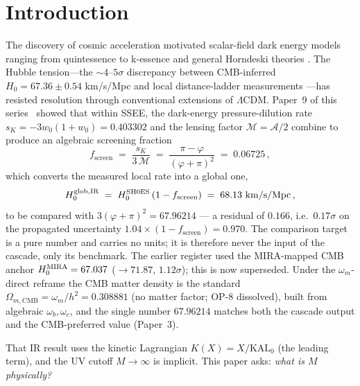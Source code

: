 \documentclass[12pt,a4paper]{article}
\newcommand{\phiG}{\varphi}
\newcommand{\KAL}{\mathrm{KAL}_0}
\newcommand{\MIRA}{\mathcal{M}}
\newcommand{\AURA}{\mathcal{A}}
\newcommand{\fsc}{f_{\mathrm{screen}}}
\newcommand{\sK}{s_K}
\renewcommand{\Omega}{\varOmega}
\begin{document}
\clearpage
{\small\tableofcontents}
\clearpage

\section{Introduction}

The discovery of cosmic acceleration \citep{Riess1998,Perlmutter1999} motivated
scalar-field dark energy models ranging from quintessence \citep{Ratra1988,Caldwell2002}
to k-essence \citep{ArmendarizPicon2001} and general Horndeski theories
\citep{Horndeski1974,Copeland2006,Weinberg2013review}.
The Hubble tension---the $\sim4$--$5\sigma$ discrepancy between CMB-inferred
$H_0 = 67.36 \pm 0.54$ km/s/Mpc \citep{Planck2018} and local distance-ladder
measurements \citep{Verde2019,Kamionkowski2023}---has
resisted resolution through conventional extensions of $\Lambda$CDM.
Paper~9 of this series~\citep{SSEE9} showed that within SSEE, the dark-energy
pressure-dilution rate $\sK = -3w_0(1+w_0) = 0.403302$ \citep{SSEE7,SSEE8} and the lensing factor
$\MIRA = \AURA/2$ combine to produce an algebraic screening fraction
\begin{equation}
  \fsc \;=\; \frac{\sK}{3\,\MIRA}
       \;=\; \frac{\pi - \phiG}{(\phiG+\pi)^2}
       \;=\; 0.06725\,,
\end{equation}
which converts the measured local rate into a global one,
\begin{equation}
  H_0^{\rm glob,IR} \;=\; H_0^{\rm SH0ES}\,(1 - \fsc) \;=\; 68.13 \text{ km/s/Mpc}\,,
\end{equation}
to be compared with $3(\phiG+\pi)^2 = 67.96214$ --- a residual of $0.166$,
i.e.\ $0.17\sigma$ on the propagated uncertainty $1.04\times(1-\fsc)=0.970$.
The comparison target is a pure number and carries no units; it is therefore
never the input of the cascade, only its benchmark. The earlier
register used the MIRA-mapped CMB anchor $H_0^{\rm MIRA} = 67.037$ ($\to 71.87$,
$1.12\sigma$); this is now superseded. Under the $\omega_m$-direct reframe the
CMB matter density is the standard $\Omega_{m,\mathrm{CMB}}=\omega_m/h^2=0.308881$
(no matter factor; OP-8 dissolved), built from algebraic $\omega_b,\omega_c$, and
the single number $67.96214$ matches both the cascade output and the CMB-preferred value
(Paper~3).

That IR result uses the kinetic Lagrangian $K(X) = X/\KAL$ (the leading term),
and the UV cutoff $M \to \infty$ is implicit.
This paper asks: \emph{what is $M$ physically?}
\end{document}
